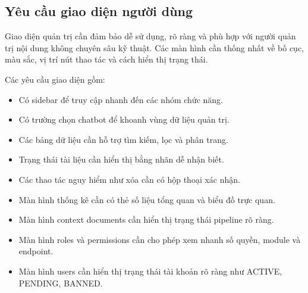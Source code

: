 \subsection{Yêu cầu giao diện người dùng}

Giao diện quản trị cần đảm bảo dễ sử dụng, rõ ràng và phù hợp với người quản trị nội dung không chuyên sâu kỹ thuật. Các màn hình cần thống nhất về bố cục, màu sắc, vị trí nút thao tác và cách hiển thị trạng thái.

Các yêu cầu giao diện gồm:

\begin{itemize}
    \item Có sidebar để truy cập nhanh đến các nhóm chức năng.
    \item Có trường chọn chatbot để khoanh vùng dữ liệu quản trị.
    \item Các bảng dữ liệu cần hỗ trợ tìm kiếm, lọc và phân trang.
    \item Trạng thái tài liệu cần hiển thị bằng nhãn dễ nhận biết.
    \item Các thao tác nguy hiểm như xóa cần có hộp thoại xác nhận.
    \item Màn hình thống kê cần có thẻ số liệu tổng quan và biểu đồ trực quan.
    \item Màn hình context documents cần hiển thị trạng thái pipeline rõ ràng.
    \item Màn hình roles và permissions cần cho phép xem nhanh số quyền, module và endpoint.
    \item Màn hình users cần hiển thị trạng thái tài khoản rõ ràng như ACTIVE, PENDING, BANNED.
\end{itemize}
